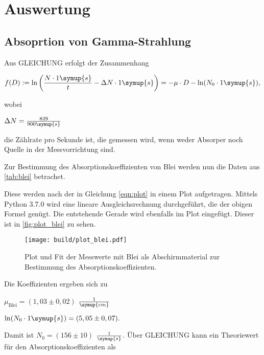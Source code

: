\section{Auswertung}
\label{sec:Auswertung}

\subsection{Absoprtion von Gamma-Strahlung}

Aus GLEICHUNG erfolgt der Zusammenhang

\begin{equation}
    \label{eqn:plot}
    f(D) := \ln \bigg (\frac{ N \cdot 1 \symup{s}}{t} - \Delta N \cdot 1 \symup{s} \bigg) = - \mu \cdot D - \ln (N_0 \cdot 1 \symup{s}),
\end{equation}

wobei

\begin{center}
    $\Delta N = \frac{829}{900 \symup{s}}$
\end{center}

die Zählrate pro Sekunde ist, die gemessen wird, wenn weder Absorper noch Quelle in der Messvorrichtung sind.

Zur Bestimmung des Absorptionskoeffizienten von Blei werden nun die Daten aus \autoref{tab:blei} betrachet.



Diese werden nach der in Gleichung \eqref{eqn:plot} in einem Plot aufgetragen.
Mittels Python 3.7.0 wird eine lineare Ausgleichsrechnung durchgeführt, die der obigen Formel genügt.
Die entstehende Gerade wird ebenfalls im Plot eingefügt.
Dieser ist in \autoref{fig:plot_blei} zu sehen.

\begin{figure}
    \centering
    \texttt{[image: build/plot\_blei.pdf]}
    \caption{Plot und Fit der Messwerte mit Blei als Abschirmmaterial zur Bestimmung des Absorptionskoeffizienten.}
    \label{fig:plot_blei}
\end{figure}

Die Koeffizienten ergeben sich zu 

\begin{center}
    $\mu_\text{Blei} = (1,03 \pm 0,02)$ $\frac{1}{\symup{cm}}$

    $\ln ( N_ 0 \cdot 1 \symup{s}) = (5,05 \pm 0,07).$
\end{center}

Damit ist $N_0 = (156 \pm 10)$ $\frac{1}{\symup{s}}$.
Über GLEICHUNG kann ein Theoriewert für den Absorptionskoeffizienten als

